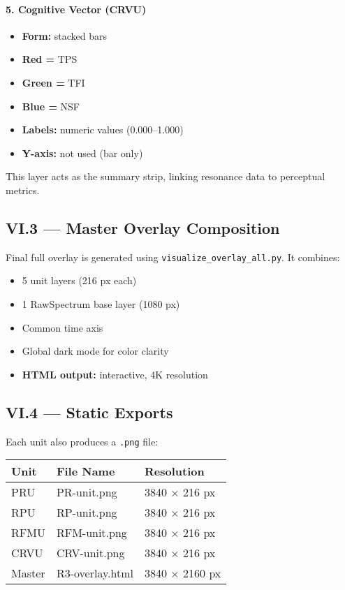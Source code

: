 \paragraph{5. Cognitive Vector (CRVU)}

\begin{itemize}
    \item \textbf{Form:} stacked bars
    \item \textbf{Red =} TPS
    \item \textbf{Green =} TFI
    \item \textbf{Blue =} NSF
    \item \textbf{Labels:} numeric values (0.000–1.000)
    \item \textbf{Y-axis:} not used (bar only)
\end{itemize}

This layer acts as the summary strip, linking resonance data to perceptual metrics.

\subsection*{VI.3 — Master Overlay Composition}

Final full overlay is generated using \texttt{visualize\_overlay\_all.py}. It combines:

\begin{itemize}
    \item 5 unit layers (216 px each)
    \item 1 RawSpectrum base layer (1080 px)
    \item Common time axis
    \item Global dark mode for color clarity
    \item \textbf{HTML output:} interactive, 4K resolution
\end{itemize}

\subsection*{VI.4 — Static Exports}

Each unit also produces a \texttt{.png} file:

\begin{center}
\begin{tabular}{|l|l|l|}
\hline
\textbf{Unit} & \textbf{File Name} & \textbf{Resolution} \\
\hline
PRU & PR-unit.png & 3840 × 216 px \\
RPU & RP-unit.png & 3840 × 216 px \\
RFMU & RFM-unit.png & 3840 × 216 px \\
CRVU & CRV-unit.png & 3840 × 216 px \\
Master & R3-overlay.html & 3840 × 2160 px \\
\hline
\end{tabular}
\end{center}

